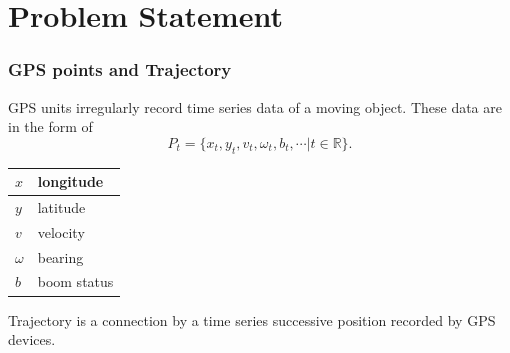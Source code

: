\documentclass{beamer}
\begin{document}
\section{Problem Statement} 
\begin{frame}
	\frametitle{GPS points and Trajectory}
	
GPS units irregularly record time series data of a moving object. These data are in the form of
\begin{equation}
P_t=\{x_t,y_t,v_t,\omega_t, b_t, \cdots | t \in \mathbb{R} \}.
\end{equation}
\begin{table}[]
\centering
\begin{tabular}{|l|l|}
\hline
$x$     & longitude   \\ \hline
$y$     & latitude    \\ \hline
$v$      & velocity    \\ \hline
$\omega$ & bearing     \\ \hline
$b$     & boom status \\ \hline
\end{tabular}
\end{table}

Trajectory is a connection by a time series successive position recorded by GPS devices. 

\end{frame}
\end{document}
